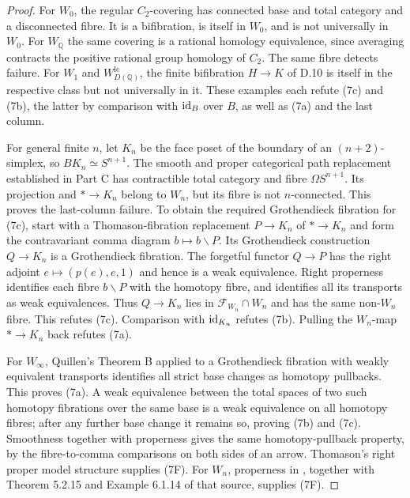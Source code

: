 \begin{proof}
For $W_0$, the regular $C_2$-covering has connected base and total category and a disconnected fibre. It is a bifibration, is itself in $W_0$, and is not universally in $W_0$. For $W_{\mathbb Q}$ the same covering is a rational homology equivalence, since averaging contracts the positive rational group homology of $C_2$. The same fibre detects failure. For $W_1$ and $W_{D(\mathbb Q)}^{\mathrm{lc}}$, the finite bifibration $H\to K$ of D.10 is itself in the respective class but not universally in it. These examples each refute (7c) and (7b), the latter by comparison with $\mathrm{id}_B$ over $B$, as well as (7a) and the last column.

For general finite $n$, let $K_n$ be the face poset of the boundary of an $(n+2)$-simplex, so $BK_n\simeq S^{n+1}$. The smooth and proper categorical path replacement established in Part C has contractible total category and fibre $\Omega S^{n+1}$. Its projection and $*\to K_n$ belong to $W_n$, but its fibre is not $n$-connected. This proves the last-column failure. To obtain the required Grothendieck fibration for (7c), start with a Thomason-fibration replacement $P\to K_n$ of $*\to K_n$ and form the contravariant comma diagram $b\mapsto b\backslash P$. Its Grothendieck construction $Q\to K_n$ is a Grothendieck fibration. The forgetful functor $Q\to P$ has the right adjoint $e\mapsto(p(e),e,1)$ and hence is a weak equivalence. Right properness identifies each fibre $b\backslash P$ with the homotopy fibre, and identifies all its transports as weak equivalences. Thus $Q\to K_n$ lies in $\mathcal F_{W_n}\cap W_n$ and has the same non-$W_n$ fibre. This refutes (7c). Comparison with $\mathrm{id}_{K_n}$ refutes (7b). Pulling the $W_n$-map $*\to K_n$ back refutes (7a).

For $W_\infty$, Quillen's Theorem B applied to a Grothendieck fibration with weakly equivalent transports identifies all strict base changes as homotopy pullbacks. This proves (7a). A weak equivalence between the total spaces of two such homotopy fibrations over the same base is a weak equivalence on all homotopy fibres; after any further base change it remains so, proving (7b) and (7c). Smoothness together with properness gives the same homotopy-pullback property, by the fibre-to-comma comparisons on both sides of an arrow. Thomason's right proper model structure supplies (7F). For $W_n$, properness in \citet[Section 9.2.1]{RESCisinski2006}, together with Theorem 5.2.15 and Example 6.1.14 of that source, supplies (7F).


\end{proof}
